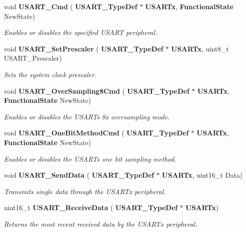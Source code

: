 \begin{DoxyCompactItemize}
void \textbf{ U\+S\+A\+R\+T\+\_\+\+Cmd} (\textbf{ U\+S\+A\+R\+T\+\_\+\+Type\+Def} $\ast$\textbf{ U\+S\+A\+R\+Tx}, \textbf{ Functional\+State} New\+State)
\begin{DoxyCompactList}\small\item\em Enables or disables the specified U\+S\+A\+RT peripheral. \end{DoxyCompactList}\item 
void \textbf{ U\+S\+A\+R\+T\+\_\+\+Set\+Prescaler} (\textbf{ U\+S\+A\+R\+T\+\_\+\+Type\+Def} $\ast$\textbf{ U\+S\+A\+R\+Tx}, uint8\+\_\+t U\+S\+A\+R\+T\+\_\+\+Prescaler)
\begin{DoxyCompactList}\small\item\em Sets the system clock prescaler. \end{DoxyCompactList}\item 
void \textbf{ U\+S\+A\+R\+T\+\_\+\+Over\+Sampling8\+Cmd} (\textbf{ U\+S\+A\+R\+T\+\_\+\+Type\+Def} $\ast$\textbf{ U\+S\+A\+R\+Tx}, \textbf{ Functional\+State} New\+State)
\begin{DoxyCompactList}\small\item\em Enables or disables the U\+S\+A\+RT\textquotesingle{}s 8x oversampling mode. \end{DoxyCompactList}\item 
void \textbf{ U\+S\+A\+R\+T\+\_\+\+One\+Bit\+Method\+Cmd} (\textbf{ U\+S\+A\+R\+T\+\_\+\+Type\+Def} $\ast$\textbf{ U\+S\+A\+R\+Tx}, \textbf{ Functional\+State} New\+State)
\begin{DoxyCompactList}\small\item\em Enables or disables the U\+S\+A\+RT\textquotesingle{}s one bit sampling method. \end{DoxyCompactList}\item 
void \textbf{ U\+S\+A\+R\+T\+\_\+\+Send\+Data} (\textbf{ U\+S\+A\+R\+T\+\_\+\+Type\+Def} $\ast$\textbf{ U\+S\+A\+R\+Tx}, uint16\+\_\+t Data)
\begin{DoxyCompactList}\small\item\em Transmits single data through the U\+S\+A\+R\+Tx peripheral. \end{DoxyCompactList}\item 
uint16\+\_\+t \textbf{ U\+S\+A\+R\+T\+\_\+\+Receive\+Data} (\textbf{ U\+S\+A\+R\+T\+\_\+\+Type\+Def} $\ast$\textbf{ U\+S\+A\+R\+Tx})
\begin{DoxyCompactList}\small\item\em Returns the most recent received data by the U\+S\+A\+R\+Tx peripheral. \end{DoxyCompactList}\item 

\end{DoxyCompactItemize}
